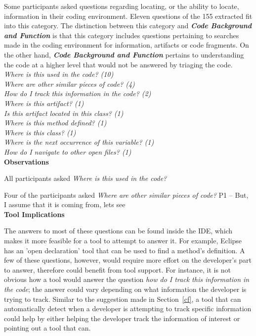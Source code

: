 \documentclass[conference]{IEEEtran}
\begin{document}
Some participants asked questions regarding locating, or the ability to locate, information in their coding environment. 
Eleven questions of the 155 extracted fit into this category.
The distinction between this category and \emph{\textbf{Code Background and Function}} is that this category includes questions pertaining to searches made in the coding environment for information, artifacts or code fragments. 
On the other hand, \emph{\textbf{Code Background and Function}} pertains to understanding the code at a higher level that would not be answered by triaging the code.
\\

\noindent\emph{Where is this used in the code? (10)} \\
\emph{Where are other similar pieces of code? (4)} \\
\emph{How do I track this information in the code? (2)} \\
\emph{Where is this artifact? (1)} \\
\emph{Is this artifact located in this class? (1)} \\
\emph{Where is this method defined? (1)} \\
\emph{Where is this class? (1)} \\
\emph{Where is the next occurrence of this variable? (1)} \\
\emph{How do I navigate to other open files? (1)} \\


\noindent\textbf{Observations}

All participants asked \textit{Where is this used in the code?}

Four of the participants asked \textit{Where are other similar pieces of code?}
P1 -- But, I assume that it is coming from, lets see
\\

\noindent\textbf{Tool Implications}

The answers to most of these questions can be found inside the IDE, which makes it more feasible for a tool to attempt to answer it. For example, Eclipse has an 'open declaration' tool that can be used to find a method's definition. A few of these questions, however, would require more effort on the developer's part to answer, therefore could benefit from tool support. For instance, it is not obvious how a tool would answer the question \emph{how do I track this information in the code}; the answer could vary depending on what information the developer is trying to track.
Similar to the suggestion made in Section~\ref{cf}, a tool that can automatically detect when a developer is attempting to track specific information could help by either helping the developer track the information of interest or pointing out a tool that can.
\end{document}
